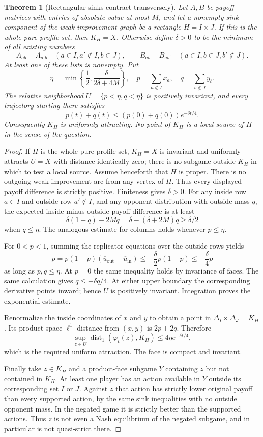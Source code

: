 \documentclass[11pt]{article}
\newtheorem{theorem}{Theorem}
\theoremstyle{definition}
\theoremstyle{remark}
\begin{document}
\begin{theorem}[Rectangular sinks contract transversely]
Let $A,B$ be payoff matrices with entries of absolute value at most $M$, and let a nonempty sink component of the weak-improvement graph be a rectangle $H=I\times J$. If this is the whole pure-profile set, then $K_H=X$. Otherwise define $\delta>0$ to be the minimum of all existing numbers
\[
 A_{ab}-A_{a'b}\quad(a\in I,a'\notin I,b\in J),
 \qquad
 B_{ab}-B_{ab'}\quad(a\in I,b\in J,b'\notin J).
\]
At least one of these lists is nonempty. Put
\[
 \eta=\min\left\{\frac12,\frac{\delta}{2\delta+4M}\right\},
 \quad p=\sum_{a\notin I}x_a,\quad q=\sum_{b\notin J}y_b.
\]
The relative neighborhood $U=\{p<\eta,q<\eta\}$ is positively invariant, and every trajectory starting there satisfies
\[
 p(t)+q(t)\leq(p(0)+q(0))e^{-\delta t/4}.
\]
Consequently $K_H$ is uniformly attracting. No point of $K_H$ is a local source of $H$ in the sense of the question.
\end{theorem}
\begin{proof}
If $H$ is the whole pure-profile set, $K_H=X$ is invariant and uniformly
attracts $U=X$ with distance identically zero; there is no subgame outside
$K_H$ in which to test a local source. Assume henceforth that $H$ is proper.
There is no outgoing weak-improvement arc from any vertex of $H$. Thus every displayed payoff difference is strictly positive. Finiteness gives $\delta>0$. For any inside row $a\in I$ and outside row $a'\notin I$, and any opponent distribution with outside mass $q$, the expected inside-minus-outside payoff difference is at least
\[
 \delta(1-q)-2Mq=\delta-(\delta+2M)q\geq\delta/2
\]
when $q\leq\eta$. The analogous estimate for columns holds whenever $p\leq\eta$.

For $0<p<1$, summing the replicator equations over the outside rows yields
\[
 \dot p=p(1-p)(\overline u_{\mathrm{out}}-\overline u_{\mathrm{in}})
 \leq-\frac\delta2 p(1-p)\leq-\frac\delta4p
\]
as long as $p,q\leq\eta$. At $p=0$ the same inequality holds by invariance of faces. The same calculation gives $\dot q\leq-\delta q/4$. At either upper boundary the corresponding derivative points inward; hence $U$ is positively invariant. Integration proves the exponential estimate.

Renormalize the inside coordinates of $x$ and $y$ to obtain a point in $\Delta_I\times\Delta_J=K_H$. Its product-space $\ell^1$ distance from $(x,y)$ is $2p+2q$. Therefore
\[
 \sup_{z\in U}\operatorname{dist}_1(\varphi_t(z),K_H)
 \leq4\eta e^{-\delta t/4},
\]
which is the required uniform attraction. The face is compact and invariant.

Finally take $z\in K_H$ and a product-face subgame $Y$ containing $z$ but not contained in $K_H$. At least one player has an action available in $Y$ outside its corresponding set $I$ or $J$. Against $z$ that action has strictly lower original payoff than every supported action, by the same sink inequalities with no outside opponent mass. In the negated game it is strictly better than the supported actions. Thus $z$ is not even a Nash equilibrium of the negated subgame, and in particular is not quasi-strict there.
\end{proof}
\end{document}
